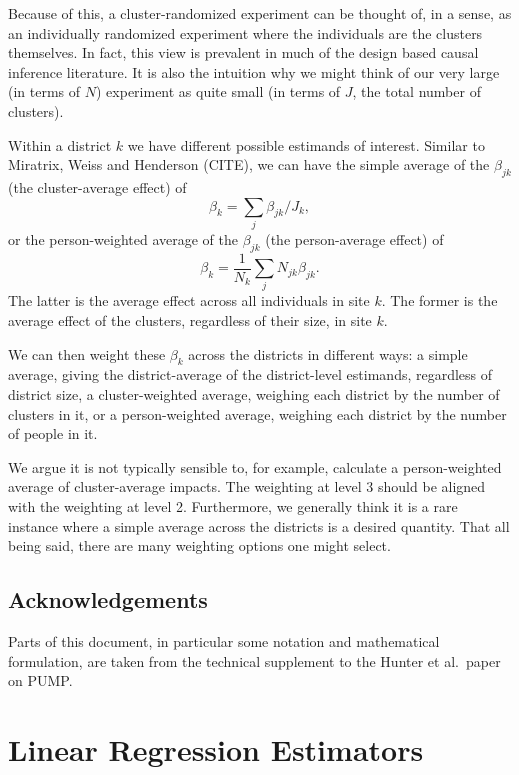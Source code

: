 \documentclass[]{article}
\begin{document}
Because of this, a cluster-randomized experiment can be thought of, in a sense, as an individually randomized experiment where the individuals are the clusters themselves.
In fact, this view is prevalent in much of the design based causal inference literature.
It is also the intuition why we might think of our very large (in terms of $N$) experiment as quite small (in terms of $J$, the total number of clusters).

Within a district $k$ we have different possible estimands of interest.
Similar to Miratrix, Weiss and Henderson (CITE), we can have the simple average of the $\beta_{jk}$ (the cluster-average effect) of
$$ \beta_k = \sum_j \beta_{jk} / J_k , $$
or the person-weighted average of the $\beta_{jk}$ (the person-average effect) of
$$ \beta_k = \frac{1}{N_k} \sum_j N_{jk} \beta_{jk} .$$
The latter is the average effect across all individuals in site $k$.
The former is the average effect of the clusters, regardless of their size, in site $k$.

We can then weight these $\beta_k$ across the districts in different ways: a simple average, giving the district-average of the district-level estimands, regardless of district size, a cluster-weighted average, weighing each district by the number of clusters in it, or a person-weighted average, weighing each district by the number of people in it.

We argue it is not typically sensible to, for example, calculate a person-weighted average of cluster-average impacts.
The weighting at level 3 should be aligned with the weighting at level 2.
Furthermore, we generally think it is a rare instance where a simple average across the districts is a desired quantity.
That all being said, there are many weighting options one might select.



\subsection{Acknowledgements}\label{acknowledgements}

Parts of this document, in particular some notation and mathematical
formulation, are taken from the technical supplement to the Hunter et
al.~paper on PUMP.



\section{Linear Regression Estimators}\label{linear-regression-estimators}
\end{document}
